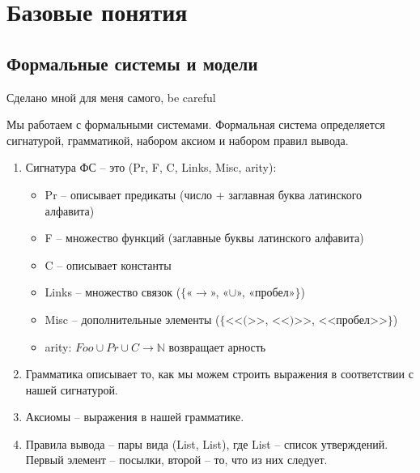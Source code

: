 \section{Базовые понятия}
\label{sec-1}
\subsection{Формальные системы и модели}
\label{sec-1-1}
Сделано мной для меня самого, be careful

Мы работаем с формальными системами.
Формальная система определяется сигнатурой, грамматикой,
набором аксиом и набором правил вывода.
\begin{enumerate}
\item Сигнатура ФС -- это (Pr, F, C, Links, Misc, arity):
\begin{itemize}
\item Pr -- описывает предикаты (число + заглавная буква латинского алфавита)
\item F -- множество функций (заглавные буквы латинского алфавита)
\item C -- описывает константы
\item Links -- множество связок ($\lbrace$«$\to$», «$\cup$», «пробел»$\rbrace$)
\item Misc -- дополнительные элементы ($\lbrace$<<$($>>, <<$)$>>, <<пробел>>$\rbrace$)
\item arity: $Foo \cup Pr \cup C \to \mathbb N$ возвращает арность
\end{itemize}
\item Грамматика описывает то, как мы можем строить выражения
в соответствии с нашей сигнатурой.
\item Аксиомы -- выражения в нашей грамматике.
\item Правила вывода -- пары вида (List, List), где List --
список утверждений. Первый элемент – посылки, второй --
то, что из них следует.
\end{enumerate}

